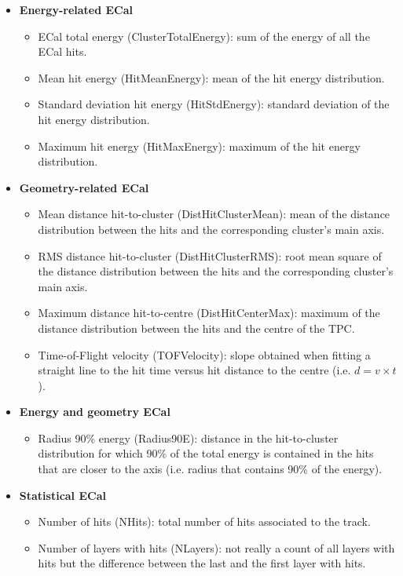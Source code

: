 \begin{itemize}
	\item \textbf{Energy-related ECal}
	\begin{itemize}
		\item ECal total energy (ClusterTotalEnergy): sum of the energy of all the ECal hits.
	\item Mean hit energy (HitMeanEnergy): mean of the hit energy distribution.
	\item Standard deviation hit energy (HitStdEnergy): standard deviation of the hit energy distribution.
	\item Maximum hit energy (HitMaxEnergy): maximum of the hit energy distribution.
	\end{itemize}
	\item \textbf{Geometry-related ECal}
	\begin{itemize}
		\item Mean distance hit-to-cluster (DistHitClusterMean): mean of the distance distribution between the hits and the corresponding cluster's main axis.
		\item RMS distance hit-to-cluster (DistHitClusterRMS): root mean square of the distance distribution between the hits and the corresponding cluster's main axis.
		\item Maximum distance hit-to-centre (DistHitCenterMax): maximum of the distance distribution between the hits and the centre of the TPC.
		\item Time-of-Flight velocity (TOFVelocity): slope obtained when fitting a straight line to the hit time versus hit distance to the centre (i.e. $d = v \times t$).
	\end{itemize}
	\item \textbf{Energy and geometry ECal}
	\begin{itemize}
		\item Radius 90\% energy (Radius90E): distance in the hit-to-cluster distribution for which 90\% of the total energy is contained in the hits that are closer to the axis (i.e. radius that contains 90\% of the energy).
	\end{itemize}
	\item \textbf{Statistical ECal}
	\begin{itemize}
		\item Number of hits (NHits): total number of hits associated to the track.
		\item Number of layers with hits (NLayers): not really a count of all layers with hits but the difference between the last and the first layer with hits.
	\end{itemize}
\end{itemize}

